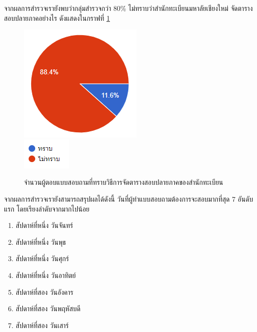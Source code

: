 จากผลการสำรวจเรายังพบว่ากลุ่มสำรวจกว่า 80\% ไม่ทราบว่าสำนักทะเบียนมหาลัยเชียงใหม่ จัดตารางสอบปลายภาคอย่างไร ดังแสดงในกราฟที่ \ref{fig:registration_exam}
\begin{figure}
  \begin{center}
    \includegraphics{images/registration_exam.png}\\[2ex]
    \includegraphics{images/legend_for_registration_exam.png}
  \end{center}
  \caption[จำนวนผู้ตอบแบบสอบถามที่ทราบวิธีการจัดตารางสอบปลายภาคของสำนักทะเบียน]{จำนวนผู้ตอบแบบสอบถามที่ทราบวิธีการจัดตารางสอบปลายภาคของสำนักทะเบียน}
  \label{fig:registration_exam}     
\end{figure}

จากผลการสำรวจเรายังสามารถสรุปผลได้ดังนี้
วันที่ผู้ทำแบบสอบถามต้องการจะสอบมากที่สุด 7 อันดับแรก โดยเรียงลำดับจากมากไปน้อย
\begin{enumerate}
  \item สัปดาห์ที่หนึ่ง วันจันทร์
  \item สัปดาห์ที่หนึ่ง วันพุธ
  \item สัปดาห์ที่หนึ่ง วันศุกร์ 
  \item สัปดาห์ที่หนึ่ง วันอาทิตย์
  \item สัปดาห์ที่สอง วันอังคาร
  \item สัปดาห์ที่สอง วันพฤหัสบดี
  \item สัปดาห์ที่สอง วันเสาร์
\end{enumerate}

